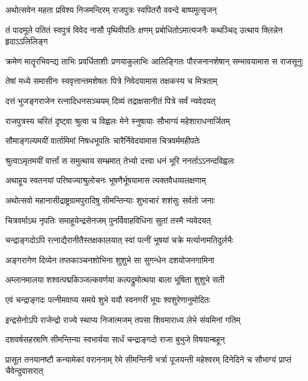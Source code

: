 \twolineshloka
{अथोत्सवेन महता प्रविश्य निजमन्दिरम्}
{राजपुत्रः स्वपितरौ ववन्दे बाष्पमुत्सृजन्} %

\fourlineindentedshloka
{तं पादमूले पतितं स्वपुत्रं}
{विवेद नासौ पृथिवीपतिः क्षणम्}
{प्रबोधितोऽमात्यजनैः कथञ्चिद्}
{उत्थाय क्लिन्नेन हृदाऽऽलिलिङ्ग} %

\fourlineindentedshloka
{क्रमेण मातॄरभिवन्द्य ताभिः}
{प्रवर्धिताशीः प्रणयाकुलाभिः}
{आलिङ्गितः पौरजनानशेषान्}
{सम्भावयामास स राजसूनुः} %

\twolineshloka
{तेषां मध्ये समासीनः स्ववृत्तान्तमशेषतः}
{पित्रे निवेदयामास तक्षकस्य च मित्रताम्} %

\twolineshloka
{दत्तं भुजङ्गराजेन रत्नादिधनसञ्चयम्}
{दिव्यं तद्राक्षसानीतं पित्रे सर्वं न्यवेदयत्} %

\twolineshloka
{राजपुत्रस्य चरितं दृष्ट्वा श्रुत्वा च विह्वलः}
{मेने स्नुषायाः सौभाग्यं महेशाराधनार्जितम्} %

\twolineshloka
{सौमाङ्गल्यमयीं वार्तामिमां निषधभूपतिः}
{चारैर्निवेदयामास चित्रवर्ममहीपतेः} %

\twolineshloka
{श्रुत्वाऽमृतमयीं वार्त्तां स समुत्थाय सम्भ्रमात्}
{तेभ्यो दत्त्वा धनं भूरि ननर्ताऽऽनन्दविह्वलः} %

\twolineshloka
{अथाहूय स्वतनयां परिष्वज्याश्रुलोचनः}
{भूषणैर्भूषयामास त्यक्तवैधव्यलक्षणाम्} %

\twolineshloka
{अथोत्सवो महानासीद्राष्ट्रग्रामपुरादिषु}
{सीमन्तिन्याः शुभाचारं शशंसुः सर्वतो जनाः} %

\twolineshloka
{चित्रवर्माऽथ नृपतिः समाहूयेन्द्रसेनजम्}
{पुनर्विवाहविधिना सुतां तस्मै न्यवेदयत्} %

\twolineshloka
{चन्द्राङ्गदोऽपि रत्नाद्यैरानीतैस्तक्षकालयात्}
{स्वां पत्नीं भूषयां चक्रे मर्त्यानामतिदुर्लभैः} %

\twolineshloka
{अङ्गरागेण दिव्येन तप्तकाञ्चनशोभिना}
{शुशुभे सा सुगन्धेन दशयोजनगामिना} %

\twolineshloka
{अम्लानमालया शश्वत्पद्मकिञ्जल्कवर्णया}
{कल्पद्रुमोत्थया बाला भूषिता शुशुभे सती} %

\twolineshloka
{एवं चन्द्राङ्गदः पत्नीमवाप्य समये शुभे}
{ययौ स्वनगरीं भूयः श्वशुरेणानुमोदितः} %

\twolineshloka
{इन्द्रसेनोऽपि राजेन्द्रो राज्ये स्थाप्य निजात्मजम्}
{तपसा शिवमाराध्य लेभे संयमिनां गतिम्} %

\twolineshloka
{दशवर्षसहस्राणि सीमन्तिन्या स्वभार्यया}
{सार्धं चन्द्राङ्गदो राजा बुभुजे विषयान्बहून्} %

\threelineshloka
{प्रासूत तनयानष्टौ कन्यामेकां वराननाम्}
{रेमे सीमन्तिनी भर्त्रा पूजयन्ती महेश्वरम्}
{दिनेदिने च सौभाग्यं प्राप्तं चैवेन्दुवासरात्} %

